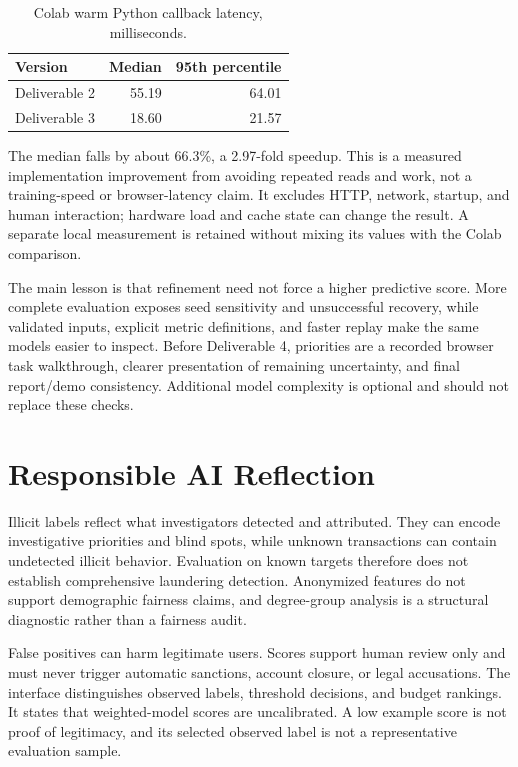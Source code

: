 \documentclass[conference]{IEEEtran}
\begin{document}
\begin{table}[t]\caption{Colab warm Python callback latency, milliseconds.}\centering\small
\begin{tabular}{lrr}\toprule
Version & Median & 95th percentile\\\midrule
Deliverable 2 & 55.19 & 64.01\\
Deliverable 3 & 18.60 & 21.57\\\bottomrule
\end{tabular}\label{tab:latency}\end{table}

The median falls by about 66.3\%, a 2.97-fold speedup. This is a measured implementation improvement from avoiding repeated reads and work, not a training-speed or browser-latency claim. It excludes HTTP, network, startup, and human interaction; hardware load and cache state can change the result. A separate local measurement is retained without mixing its values with the Colab comparison.

The main lesson is that refinement need not force a higher predictive score. More complete evaluation exposes seed sensitivity and unsuccessful recovery, while validated inputs, explicit metric definitions, and faster replay make the same models easier to inspect. Before Deliverable 4, priorities are a recorded browser task walkthrough, clearer presentation of remaining uncertainty, and final report/demo consistency. Additional model complexity is optional and should not replace these checks.

\section{Responsible AI Reflection}
Illicit labels reflect what investigators detected and attributed. They can encode investigative priorities and blind spots, while unknown transactions can contain undetected illicit behavior. Evaluation on known targets therefore does not establish comprehensive laundering detection. Anonymized features do not support demographic fairness claims, and degree-group analysis is a structural diagnostic rather than a fairness audit.

False positives can harm legitimate users. Scores support human review only and must never trigger automatic sanctions, account closure, or legal accusations. The interface distinguishes observed labels, threshold decisions, and budget rankings. It states that weighted-model scores are uncalibrated. A low example score is not proof of legitimacy, and its selected observed label is not a representative evaluation sample.
\end{document}
